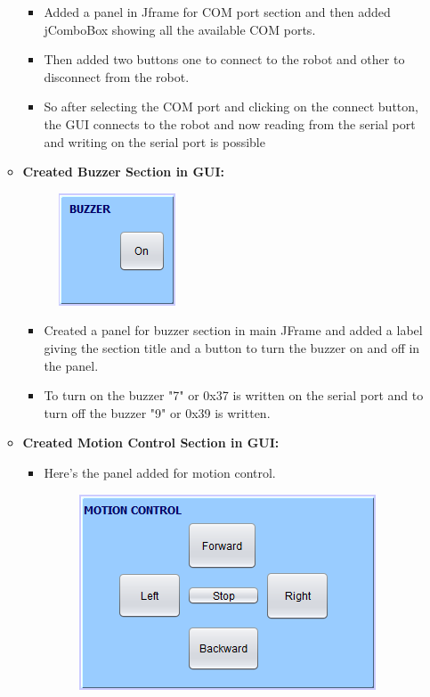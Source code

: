 \documentclass{article}
\begin{document}
\begin{enumerate}
\begin{itemize}
\begin{figure}[h]
\begin{center}
				\end{center}
			\end{figure}
			\begin{itemize}
				\item Added a panel in Jframe for COM port section and then added jComboBox showing all the available COM ports.
				\item Then added two buttons one to connect to the robot and other to disconnect from the robot.
				\item So after selecting the COM port and clicking on the connect button, the GUI connects to the robot and now reading from the serial port and writing on the serial port is possible
			\end{itemize}
			\item \textbf{Created Buzzer Section in GUI:}
			\begin{figure}[h]
				\begin{center}
					\includegraphics[scale=1]{buzzer.png}
				\end{center}
			\end{figure}
			\begin{itemize}
				\item Created a panel for buzzer section in main JFrame and added a label giving the section title and a button to turn the buzzer on and off in the panel.
				\item To turn on the buzzer "7" or 0x37 is written on the serial port and to turn off the buzzer "9" or 0x39 is written.   
			\end{itemize}   
			\item \textbf{Created Motion Control Section in GUI:}
			\begin{itemize}
				\item Here's the panel added for motion control.\\
				\begin{figure}[h]
					\begin{center}
						\includegraphics[scale=1]{motioncontrol.png}

\end{center}
\end{figure}
\end{itemize}
\end{itemize}
\end{enumerate}
\end{document}
